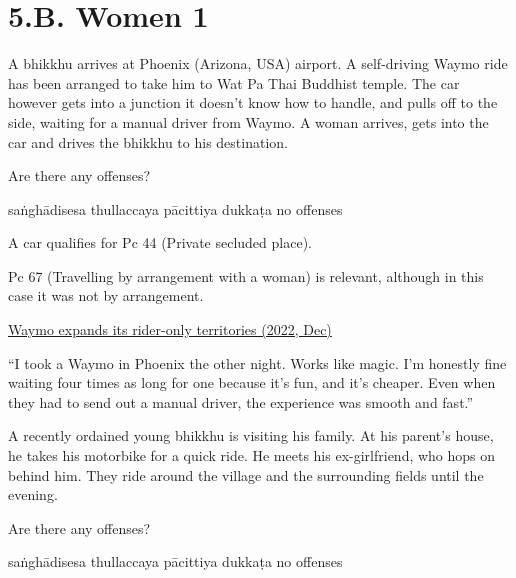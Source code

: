 \chapter{5.B. Women 1}
\renewcommand*{\theChapterTitle}{5.B. Women 1}

\begin{exam}{\autoExamName}

\begin{problem}

  A bhikkhu arrives at Phoenix (Arizona, USA) airport. A self-driving Waymo ride
  has been arranged to take him to Wat Pa Thai Buddhist temple. The car however
  gets into a junction it doesn't know how to handle, and pulls off to the side,
  waiting for a manual driver from Waymo. A woman arrives, gets into the car and
  drives the bhikkhu to his destination.

  Are there any offenses?

  \begin{answers}{5}
    \bChoices
     saṅghādisesa\eAns
     thullaccaya\eAns
     pācittiya\eAns
     dukkaṭa\eAns
     no offenses\eAns
    \eChoices
  \end{answers}

  \begin{solution}
    A car qualifies for Pc 44 (Private secluded place).

    Pc 67 (Travelling by arrangement with a woman) is relevant, although in this case it was not by arrangement.

    \href{https://news.ycombinator.com/item?id=34038562}{Waymo expands its rider-only territories (2022, Dec)}

    ``I took a Waymo in Phoenix the other night. Works like magic. I’m honestly
    fine waiting four times as long for one because it’s fun, and it’s cheaper.
    Even when they had to send out a manual driver, the experience was smooth
    and fast.''
  \end{solution}

\end{problem}

\problemDivide

\begin{problem}
  A recently ordained young bhikkhu is visiting his family. At his parent's
  house, he takes his motorbike for a quick ride. He meets his ex-girlfriend,
  who hops on behind him. They ride around the village and the surrounding
  fields until the evening.

  Are there any offenses?

  \begin{answers}{5}
    \bChoices
     saṅghādisesa\eAns
     thullaccaya\eAns
     pācittiya\eAns
     dukkaṭa\eAns
     no offenses\eAns
    \eChoices
  \end{answers}

\end{problem}



\end{exam}

